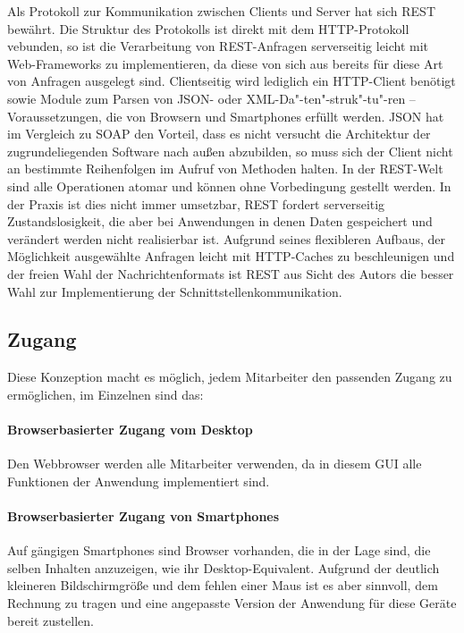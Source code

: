 Als Protokoll zur Kommunikation zwischen Clients und Server hat sich REST bewährt. Die Struktur des Protokolls ist direkt mit dem HTTP-Protokoll vebunden, so ist die Verarbeitung von REST-Anfragen serverseitig leicht mit Web-Frameworks zu implementieren, da diese von sich aus bereits für diese Art von Anfragen ausgelegt sind. Clientseitig wird lediglich ein HTTP-Client benötigt sowie Module zum Parsen von JSON- oder XML-Da"-ten"-struk"-tu"-ren -- Voraussetzungen, die von Browsern und Smartphones erfüllt werden. JSON hat im Vergleich zu SOAP den Vorteil, dass es nicht versucht die Architektur der zugrundeliegenden Software nach außen abzubilden, so muss sich der Client nicht an bestimmte Reihenfolgen im Aufruf von Methoden halten. In der REST-Welt sind alle Operationen atomar und können ohne Vorbedingung gestellt werden. In der Praxis ist dies nicht immer umsetzbar, REST fordert serverseitig Zustandslosigkeit, die aber bei Anwendungen in denen Daten gespeichert und verändert werden nicht realisierbar ist. Aufgrund seines flexibleren Aufbaus, der Möglichkeit ausgewählte Anfragen leicht mit HTTP-Caches zu beschleunigen und der freien Wahl der Nachrichtenformats ist REST aus Sicht des Autors die besser Wahl zur Implementierung der Schnittstellenkommunikation.

\pagebreak

\subsection{Zugang}

Diese Konzeption macht es möglich, jedem Mitarbeiter den passenden Zugang zu ermöglichen, im Einzelnen sind das:

\paragraph{Browserbasierter Zugang vom Desktop} Den Webbrowser werden alle Mitarbeiter verwenden, da in diesem GUI alle Funktionen der Anwendung implementiert sind.

\paragraph{Browserbasierter Zugang von Smartphones} Auf gängigen Smartphones sind Browser vorhanden, die in der Lage sind, die selben Inhalten anzuzeigen, wie ihr Desktop-Equivalent. Aufgrund der deutlich kleineren Bildschirmgröße und dem fehlen einer Maus ist es aber sinnvoll, dem Rechnung zu tragen und eine angepasste Version der Anwendung für diese Geräte bereit zustellen. 

